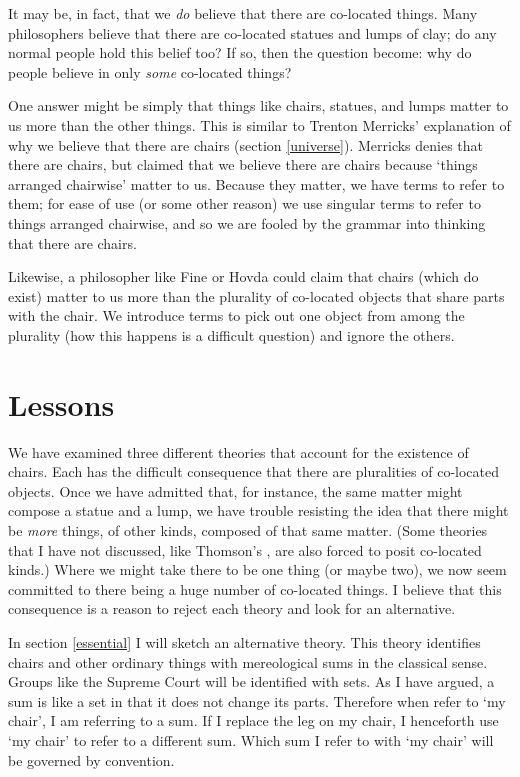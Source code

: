 \documentclass[11pt]{article}
\begin{document}
\begin{spacing}{1.5}
It may be, in fact, that we {\em do} believe that there are co-located
things.  Many philosophers believe that there are co-located statues
and lumps of clay; do any normal people hold this belief too?
If so, then the question become: why do people believe in only {\em
  some} co-located things?

One answer might be simply that things like chairs, statues, and lumps
matter to us more than the other things.  This is similar to Trenton
Merricks' explanation of why we believe that there are chairs (section
\ref{universe}).  Merricks denies that there are chairs, but claimed
that we believe there are chairs because `things arranged chairwise'
matter to us.  Because they matter, we have terms to refer to them;
for ease of use (or some other reason) we use singular terms to refer
to things arranged chairwise, and so we are fooled by the grammar into
thinking that there are chairs.

Likewise, a philosopher like Fine or Hovda could claim that chairs
(which do exist) matter to us more than the plurality of co-located
objects that share parts with the chair.  We introduce terms to pick
out one object from among the plurality (how this happens is a
difficult question) and ignore the others.

\section{Lessons}
\label{lessons-p}
We have examined three different theories that account for the
existence of chairs.  Each has the difficult consequence that there
are pluralities of co-located objects.  Once we have admitted that,
for instance, the same matter might compose a statue and a lump, we
have trouble resisting the idea that there might be {\em more} things,
of other kinds, composed of that same matter.  (Some theories that I
have not discussed, like Thomson's \citeyearpar{thomson1998a}, are
also forced to posit co-located kinds.)  Where we might take there to
be one thing (or maybe two), we now seem committed to there being a
huge number of co-located things.  I believe that this consequence is
a reason to reject each theory and look for an alternative.

In section \ref{essential} I will sketch an alternative theory.  This
theory identifies chairs and other ordinary things with mereological
sums in the classical sense.  Groups like the Supreme Court will be
identified with sets.  As I have argued, a sum is like a set in that
it does not change its parts.  Therefore when refer to `my chair', I
am referring to a sum.  If I replace the leg on my chair, I henceforth
use `my chair' to refer to a different sum.  Which sum I refer to with
`my chair' will be governed by convention.

\ifstandalone
\end{spacing}


\fi
\end{document}
